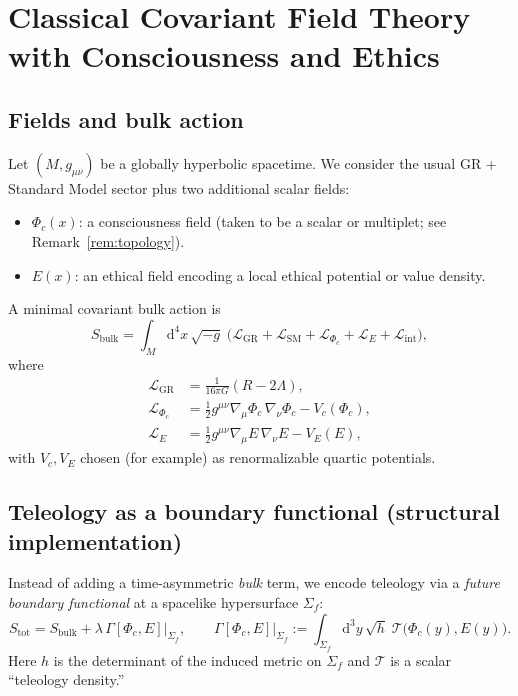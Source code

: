 \documentclass[reprint,amsmath,amssymb,aps,showkeys]{revtex4-2}
\newcommand{\dd}{\mathrm{d}}
\newcommand{\Lag}{\mathcal{L}}
\newcommand{\cT}{\mathcal{T}}
\begin{document}
\section{Classical Covariant Field Theory with Consciousness and Ethics}
\subsection{Fields and bulk action}
Let $(M,g_{\mu\nu})$ be a globally hyperbolic spacetime. We consider the usual GR + Standard Model sector plus two additional scalar fields:
\begin{itemize}
\item $\Phi_c(x)$: a consciousness field (taken to be a scalar or multiplet; see Remark~\ref{rem:topology}).
\item $E(x)$: an ethical field encoding a local ethical potential or value density.
\end{itemize}

A minimal covariant bulk action is
\begin{equation}
S_{\text{bulk}} = \int_M \dd^4x\,\sqrt{-g}\;\Big(\Lag_{\text{GR}} + \Lag_{\text{SM}} + \Lag_{\Phi_c} + \Lag_{E} + \Lag_{\text{int}}\Big),
\label{eq:Sbulk}
\end{equation}
where
\begin{align}
\Lag_{\text{GR}} &= \frac{1}{16\pi G}(R-2\Lambda),\\
\Lag_{\Phi_c} &= \frac{1}{2}g^{\mu\nu}\nabla_{\mu}\Phi_c\,\nabla_{\nu}\Phi_c - V_c(\Phi_c),\\
\Lag_{E} &= \frac{1}{2}g^{\mu\nu}\nabla_{\mu}E\,\nabla_{\nu}E - V_E(E),
\end{align}
with $V_c,V_E$ chosen (for example) as renormalizable quartic potentials.

\subsection{Teleology as a boundary functional (structural implementation)}
Instead of adding a time-asymmetric \emph{bulk} term, we encode teleology via a \emph{future boundary functional} at a spacelike hypersurface $\Sigma_f$:
\begin{equation}
S_{\text{tot}} = S_{\text{bulk}} + \lambda\,\Gamma[\Phi_c,E]\big|_{\Sigma_f},
\qquad
\Gamma[\Phi_c,E]\big|_{\Sigma_f} := \int_{\Sigma_f} \dd^3y\,\sqrt{h}\;\cT\big(\Phi_c(y),E(y)\big).
\label{eq:boundaryGamma}
\end{equation}
Here $h$ is the determinant of the induced metric on $\Sigma_f$ and $\cT$ is a scalar ``teleology density.''
\end{document}
